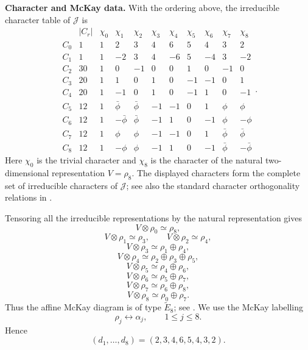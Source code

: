 \documentclass[a4paper,reqno]{amsart}
\theoremstyle{plain} %
\theoremstyle{definition} %
\theoremstyle{remark} %
\newcommand{\1}{\mathds{1}}   %
\begin{document}
\medskip

\noindent\textbf{Character and McKay data.}
With the ordering above, the irreducible character table of
\(\mathcal J\) is
\[
\begin{array}{c|c|ccccccccc}
 & |C_r|
 & \chi_0 & \chi_1 & \chi_2 & \chi_3 & \chi_4
 & \chi_5 & \chi_6 & \chi_7 & \chi_8 \\ \hline
C_0 & 1
& 1&2&3&4&6&5&4&3&2\\
C_1 & 1
& 1&-2&3&4&-6&5&-4&3&-2\\
C_2 & 30
& 1&0&-1&0&0&1&0&-1&0\\
C_3 & 20
& 1&1&0&1&0&-1&-1&0&1\\
C_4 & 20
& 1&-1&0&1&0&-1&1&0&-1\\
C_5 & 12
& 1&\bar\phi&\bar\phi&-1&-1&0&1&\phi&\phi\\
C_6 & 12
& 1&-\bar\phi&\bar\phi&-1&1&0&-1&\phi&-\phi\\
C_7 & 12
& 1&\phi&\phi&-1&-1&0&1&\bar\phi&\bar\phi\\
C_8 & 12
& 1&-\phi&\phi&-1&1&0&-1&\bar\phi&-\bar\phi
\end{array}.
\]
Here \(\chi_0\) is the trivial character and $\chi_8$ is the character of the natural two-dimensional representation $V=\rho_8$. The displayed
characters form the complete set of irreducible characters of
\(\mathcal J\); see also the standard character orthogonality relations
in \cite[Sec.~2.3]{Serre77}.

Tensoring all the irreducible representations by the natural representation gives
\[
V\otimes\rho_0\simeq\rho_8,
\]
\[
V\otimes\rho_1\simeq\rho_3,
\qquad
V\otimes\rho_2\simeq\rho_4,
\]
\[
V\otimes\rho_3\simeq\rho_1\oplus\rho_4,
\]
\[
V\otimes\rho_4\simeq\rho_2\oplus\rho_3\oplus\rho_5,
\]
\[
V\otimes\rho_5\simeq\rho_4\oplus\rho_6,
\]
\[
V\otimes\rho_6\simeq\rho_5\oplus\rho_7,
\]
\[
V\otimes\rho_7\simeq\rho_6\oplus\rho_8,
\]
\[
V\otimes\rho_8\simeq\rho_0\oplus\rho_7.
\]
Thus the affine McKay diagram is of type \(\widetilde E_8\);
see \cite{McKay}.  We use the McKay labelling
\[
\rho_j\longleftrightarrow\alpha_j,
\qquad
1\le j\le8.
\]
Hence
\[
(d_1,\ldots,d_8)
=
(2,3,4,6,5,4,3,2).
\]
\end{document}
